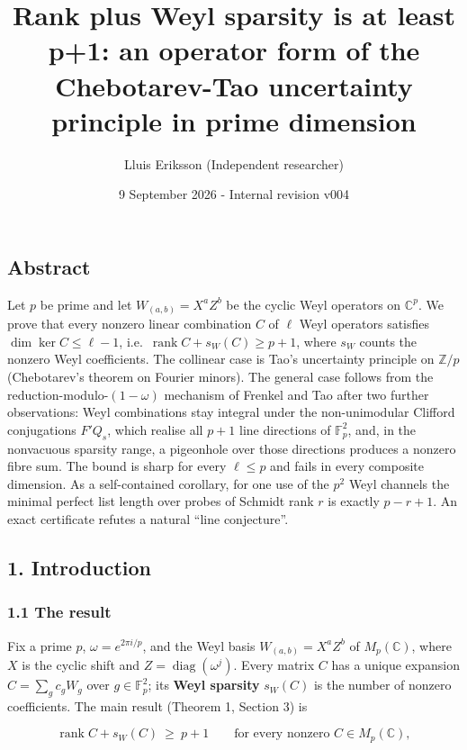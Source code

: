 \documentclass[
  11pt,
  a4paper,
]{article}
\title{Rank plus Weyl sparsity is at least p+1: an operator form of the
Chebotarev-Tao uncertainty principle in prime dimension}
\author{Lluis Eriksson (Independent researcher)}
\date{9 September 2026 - Internal revision v004}
\begin{document}
\maketitle

\subsection{Abstract}\label{abstract}

Let \(p\) be prime and let \(W_{(a,\allowbreak{}b)}=X^aZ^b\) be the cyclic Weyl
operators on \(\mathbb C^p\). We prove that every nonzero linear
combination \(C\) of \(\ell\) Weyl operators satisfies
\(\dim\ker C\le\ell-1\), i.e.~\(\operatorname{rank}C+s_W(C)\ge p+1\),
where \(s_W\) counts the nonzero Weyl coefficients. The collinear case
is Tao's uncertainty principle on \(\mathbb Z/p\) (Chebotarev's theorem
on Fourier minors). The general case follows from the
reduction-modulo-\((1-\omega)\) mechanism of Frenkel and Tao after two
further observations: Weyl combinations stay integral under the
non-unimodular Clifford conjugations \(F'Q_s\), which realise all
\(p+1\) line directions of \(\mathbb F_p^2\), and, in the nonvacuous
sparsity range, a pigeonhole over those directions produces a nonzero
fibre sum. The bound is sharp for every \(\ell\le p\) and fails in every
composite dimension. As a self-contained corollary, for one use of the
\(p^2\) Weyl channels the minimal perfect list length over probes of
Schmidt rank \(r\) is exactly \(p-r+1\). An exact certificate refutes a
natural ``line conjecture''.

\subsection{1. Introduction}\label{introduction}

\subsubsection{1.1 The result}\label{the-result}

Fix a prime \(p\), \(\omega=e^{2\pi i/p}\), and the Weyl basis
\(W_{(a,\allowbreak{}b)}=X^aZ^b\) of \(M_p(\mathbb C)\), where \(X\) is the cyclic
shift and \(Z=\operatorname{diag}(\omega^j)\). Every matrix \(C\) has a
unique expansion \(C=\sum_gc_gW_g\) over \(g\in\mathbb F_p^2\); its
\textbf{Weyl sparsity} \(s_W(C)\) is the number of nonzero coefficients.
The main result (Theorem 1, Section 3) is

\[\operatorname{rank}C+s_W(C)\ \ge\ p+1\qquad\text{for every nonzero }C\in M_p(\mathbb C),\]
\end{document}
